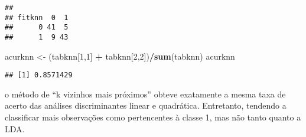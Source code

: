 \documentclass[]{article}
\newenvironment{Shaded}{\begin{snugshade}}{\end{snugshade}}
\newcommand{\KeywordTok}[1]{\textcolor[rgb]{0.13,0.29,0.53}{\textbf{#1}}}
\newcommand{\DataTypeTok}[1]{\textcolor[rgb]{0.13,0.29,0.53}{#1}}
\newcommand{\DecValTok}[1]{\textcolor[rgb]{0.00,0.00,0.81}{#1}}
\newcommand{\StringTok}[1]{\textcolor[rgb]{0.31,0.60,0.02}{#1}}
\newcommand{\OperatorTok}[1]{\textcolor[rgb]{0.81,0.36,0.00}{\textbf{#1}}}
\newcommand{\NormalTok}[1]{#1}
\begin{document}
\begin{Shaded}
\end{Shaded}

\begin{verbatim}
##       
## fitknn  0  1
##      0 41  5
##      1  9 43
\end{verbatim}

\begin{Shaded}
\begin{Highlighting}[]
\NormalTok{acurknn <-}\StringTok{ }\NormalTok{(tabknn[}\DecValTok{1}\NormalTok{,}\DecValTok{1}\NormalTok{] }\OperatorTok{+}\StringTok{ }\NormalTok{tabknn[}\DecValTok{2}\NormalTok{,}\DecValTok{2}\NormalTok{])}\OperatorTok{/}\KeywordTok{sum}\NormalTok{(tabknn)}
\NormalTok{acurknn}
\end{Highlighting}
\end{Shaded}

\begin{verbatim}
## [1] 0.8571429
\end{verbatim}

o método de ``k vizinhos mais próximos'' obteve exatamente a mesma taxa
de acerto das análises discriminantes linear e quadrática. Entretanto,
tendendo a classificar mais observações como pertencentes à classe 1,
mas não tanto quanto a LDA.
\end{document}
